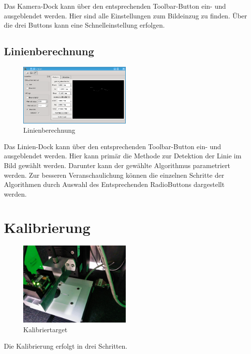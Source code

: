 \documentclass[a4paper,10pt]{scrartcl}
\begin{document}
Das Kamera-Dock kann über den entsprechenden Toolbar-Button ein- und ausgeblendet werden.
Hier sind alle Einstellungen zum Bildeinzug zu finden. Über die drei Buttons kann eine
Schnelleinstellung erfolgen.

\subsection{Linienberechnung}

\begin{figure}[H]
  \centering
  \includegraphics[width=0.5\textwidth]{include/laser.png}
  \caption{Linienberechnung}
  \label{fig:overview}
\end{figure}

Das Linien-Dock kann über den entsprechenden Toolbar-Button ein- und ausgeblendet werden.
Hier kann primär die Methode zur Detektion der Linie im Bild gewählt werden. Darunter kann
der gewählte Algorithmus parametriert werden. Zur besseren Veranschaulichung können die einzelnen
Schritte der Algorithmen durch Auswahl des Entsprechenden RadioButtons dargestellt werden.

\section{Kalibrierung}

\begin{figure}[H]
  \centering
  \includegraphics[width=0.5\textwidth]{include/IMG_20160412_162021.jpg}
  \caption{Kalibriertarget}
  \label{fig:overview}
\end{figure}

Die Kalibrierung erfolgt in drei Schritten.
\end{document}
